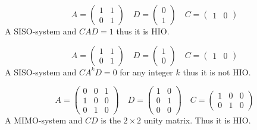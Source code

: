 \begin{example}{}{}
	\begin{equation}
	A = \begin{pmatrix}
	1 & 1 \\ 0 & 1
	\end{pmatrix}
	\quad
	D = \begin{pmatrix}
	0 \\ 1
	\end{pmatrix}
	\quad 
	C = \begin{pmatrix}
	1 & 0
	\end{pmatrix}
	\end{equation}
	A SISO-system and $CAD=1$ thus it is HIO.
\end{example}
\begin{example}{}{}
	\begin{equation}
	A = \begin{pmatrix}
	1 & 1 \\ 0 & 1
	\end{pmatrix}
	\quad
	D = \begin{pmatrix}
	1 \\ 0
	\end{pmatrix}
	\quad 
	C = \begin{pmatrix}
	1 & 0
	\end{pmatrix}
	\end{equation}
	A SISO-system and $CA^kD=0$ for any integer $k$ thus it is not HIO.
\end{example}
\begin{example}{}{}
	\begin{equation}
	A = \begin{pmatrix}
	0 & 0  & 1\\ 1 & 0 & 0 \\ 0 & 1 & 0
	\end{pmatrix}
	\quad
	D = \begin{pmatrix}
	1  & 0\\ 0 & 1 \\ 0 & 0
	\end{pmatrix}
	\quad 
	C = \begin{pmatrix}
	1 & 0 & 0 \\ 0 & 1 & 0
	\end{pmatrix}
	\end{equation}
	A MIMO-system and $CD$ is the $2\times 2$ unity matrix. Thus it is HIO.
\end{example}

